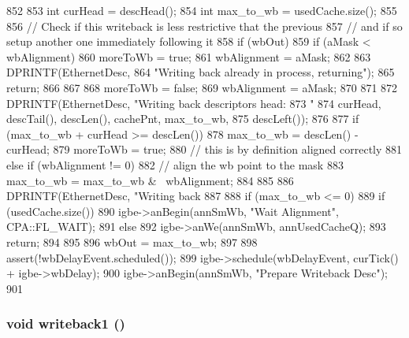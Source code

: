 \begin{DoxyCode}
852 {
853     int curHead = descHead();
854     int max_to_wb = usedCache.size();
855 
856     // Check if this writeback is less restrictive that the previous
857     // and if so setup another one immediately following it
858     if (wbOut) {
859         if (aMask < wbAlignment) {
860             moreToWb = true;
861             wbAlignment = aMask;
862         }
863         DPRINTF(EthernetDesc,
864                 "Writing back already in process, returning\n");
865         return;
866     }
867 
868     moreToWb = false;
869     wbAlignment = aMask;
870    
871 
872     DPRINTF(EthernetDesc, "Writing back descriptors head: %
873             "%
874             curHead, descTail(), descLen(), cachePnt, max_to_wb,
875             descLeft());
876 
877     if (max_to_wb + curHead >= descLen()) {
878         max_to_wb = descLen() - curHead;
879         moreToWb = true;
880         // this is by definition aligned correctly
881     } else if (wbAlignment != 0) {
882         // align the wb point to the mask
883         max_to_wb = max_to_wb & ~wbAlignment;
884     }
885 
886     DPRINTF(EthernetDesc, "Writing back %
887 
888     if (max_to_wb <= 0) {
889         if (usedCache.size())
890             igbe->anBegin(annSmWb, "Wait Alignment", CPA::FL_WAIT);
891         else
892             igbe->anWe(annSmWb, annUsedCacheQ);
893         return;
894     }
895 
896     wbOut = max_to_wb;
897 
898     assert(!wbDelayEvent.scheduled()); 
899     igbe->schedule(wbDelayEvent, curTick() + igbe->wbDelay);
900     igbe->anBegin(annSmWb, "Prepare Writeback Desc");
901 }
\end{DoxyCode}
\hypertarget{classIGbE_1_1DescCache_a427d2491d0856a590c1168301f146509}{
\subsubsection[{writeback1}]{\setlength{\rightskip}{0pt plus 5cm}void writeback1 ()}}
\label{classIGbE_1_1DescCache_a427d2491d0856a590c1168301f146509}



